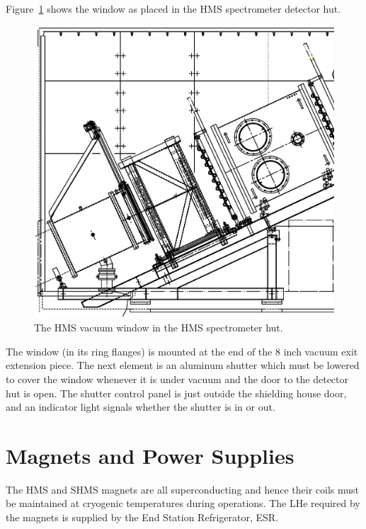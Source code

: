 {Figure~\ref{fig:hms_window2} shows the window as placed in the HMS spectrometer
detector hut.
\begin{figure}
\includegraphics[width=6in]{figHMShut}
\caption{The HMS vacuum window in the HMS spectrometer hut. 
\label{fig:hms_window2}}
\end{figure}

The window (in its ring flanges) is mounted at the end of the $8$ inch
vacuum exit extension piece. The next element is an aluminum shutter which
must be lowered to cover the window whenever it is under
vacuum and the door to the detector hut is open. The shutter
control panel is just outside the shielding house door, and an
indicator light signals whether the shutter is in or out.  



\section{Magnets and Power Supplies}

The HMS and SHMS magnets are all
superconducting and hence their coils must be maintained at
cryogenic temperatures during operations. The LHe required by the magnets
is supplied by the End Station Refrigerator, ESR.

}
